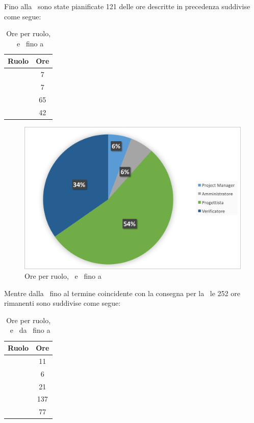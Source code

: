 \newpage
Fino alla \RP\ sono state pianificate 121 delle ore descritte in precedenza suddivise come segue:

\begin{table}[h]
	\begin{center}
		\begin{tabular}{|c|c|}
			\hline
			\textbf{Ruolo}	& \textbf{Ore} \\
			\hline
			\Pm &	7\\
			\hline
			\Am	&	7\\
			\hline
			\Prog	&	65\\
			\hline
			\Ver	&	42\\
			\hline
		\end{tabular}
	\end{center}
	\caption{Ore per ruolo, \PD\ e \COD\ fino a \RP}
\end{table}

\begin{figure}[H]
	\centering 
	\includegraphics[scale=0.7]{Immagini/GraficiTorte/PD.png}
	\caption{Ore per ruolo, \PD\ e \COD\ fino a \RP}
\end{figure}

\newpage
Mentre dalla \RP\ fino al termine coincidente con la consegna per la \RQ\ le 252 ore rimanenti sono suddivise come segue:

\begin{table}[h]
	\begin{center}
		\begin{tabular}{|c|c|}
			\hline
			\textbf{Ruolo}	& \textbf{Ore} \\
			\hline
			\Pm &	11\\
			\hline
			\Am	&	6\\
			\hline
			\Prog	&	21\\
			\hline
			\Progr	&	137\\
			\hline
			\Ver	&	77\\
			\hline
		\end{tabular}
	\end{center}
	\caption{Ore per ruolo, \PD\ e \COD\ da \RP\ fino a \RQ}
\end{table}


